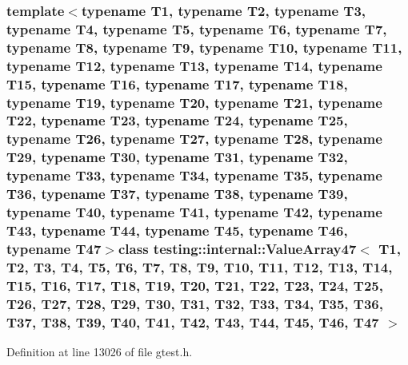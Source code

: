 \subsubsection*{template$<$typename T1, typename T2, typename T3, typename T4, typename T5, typename T6, typename T7, typename T8, typename T9, typename T10, typename T11, typename T12, typename T13, typename T14, typename T15, typename T16, typename T17, typename T18, typename T19, typename T20, typename T21, typename T22, typename T23, typename T24, typename T25, typename T26, typename T27, typename T28, typename T29, typename T30, typename T31, typename T32, typename T33, typename T34, typename T35, typename T36, typename T37, typename T38, typename T39, typename T40, typename T41, typename T42, typename T43, typename T44, typename T45, typename T46, typename T47$>$class testing\-::internal\-::\-Value\-Array47$<$ T1, T2, T3, T4, T5, T6, T7, T8, T9, T10, T11, T12, T13, T14, T15, T16, T17, T18, T19, T20, T21, T22, T23, T24, T25, T26, T27, T28, T29, T30, T31, T32, T33, T34, T35, T36, T37, T38, T39, T40, T41, T42, T43, T44, T45, T46, T47 $>$}



\-Definition at line 13026 of file gtest.\-h.



